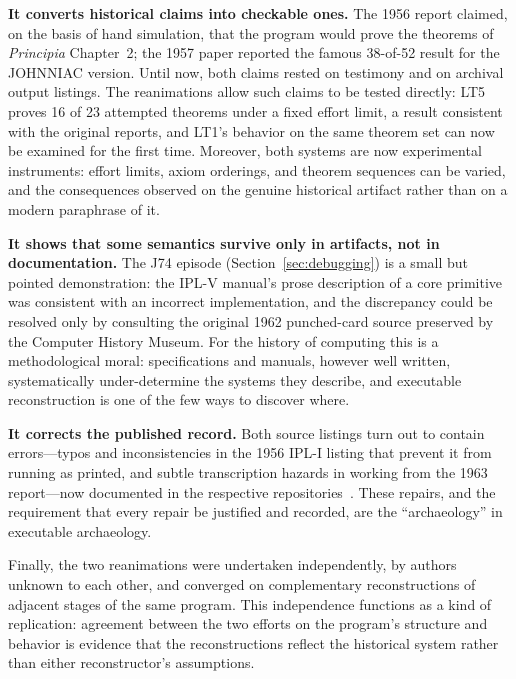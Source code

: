\documentclass[journal]{IEEEtran}
\begin{document}
\textbf{It converts historical claims into checkable ones.} The 1956
report claimed, on the basis of hand simulation, that the program
would prove the theorems of \textit{Principia} Chapter~2; the 1957
paper reported the famous 38-of-52 result for the JOHNNIAC version.
Until now, both claims rested on testimony and on archival output
listings. The reanimations allow such claims to be tested directly:
LT5 proves 16 of 23 attempted theorems under a fixed effort limit, a
result consistent with the original reports, and LT1's behavior on
the same theorem set can now be examined for the first
time.
Moreover, both systems are now experimental instruments: effort
limits, axiom orderings, and theorem sequences can be varied, and the
consequences observed on the genuine historical artifact rather than
on a modern paraphrase of it.

\textbf{It shows that some semantics survive only in artifacts, not
in documentation.} The J74 episode (Section~\ref{sec:debugging}) is a
small but pointed demonstration: the IPL-V manual's prose description
of a core primitive was consistent with an incorrect implementation,
and the discrepancy could be resolved only by consulting the original
1962 punched-card source preserved by the Computer History Museum.
For the history of computing this is a methodological moral:
specifications and manuals, however well written, systematically
under-determine the systems they describe, and executable
reconstruction is one of the few ways to discover where.

\textbf{It corrects the published record.} Both source listings turn
out to contain errors---typos and inconsistencies in the 1956 IPL-I
listing that prevent it from running as printed, and subtle
transcription hazards in working from the 1963 report---now documented
in the respective repositories~\cite{moewsrepo,runoutput}. These
repairs, and the requirement that every repair be justified and
recorded, are the ``archaeology'' in executable archaeology.

Finally, the two reanimations were undertaken independently, by
authors unknown to each other, and converged on complementary
reconstructions of adjacent stages of the same program. This
independence functions as a kind of replication: agreement between
the two efforts on the program's structure and behavior is evidence
that the reconstructions reflect the historical system rather than
either reconstructor's assumptions.
\end{document}
